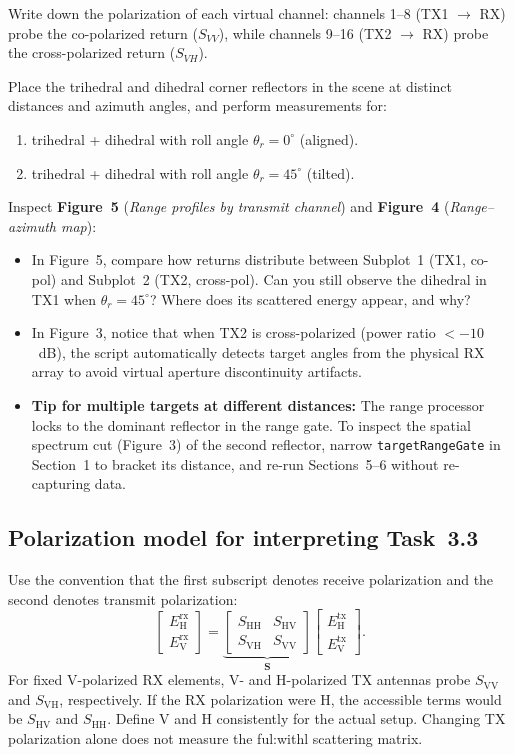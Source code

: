 \documentclass[11pt,a4paper]{article}
\begin{document}
Write down the polarization of each virtual channel: channels 1--8 (TX1 $\to$ RX) probe the co-polarized return ($S_{VV}$), while channels 9--16 (TX2 $\to$ RX) probe the cross-polarized return ($S_{VH}$).

Place the trihedral and dihedral corner reflectors in the scene at distinct distances and azimuth angles, and perform measurements for:
\begin{enumerate}
    \item trihedral + dihedral with roll angle $\theta_r = 0^\circ$ (aligned).
    \item trihedral + dihedral with roll angle $\theta_r = 45^\circ$ (tilted).
\end{enumerate}

Inspect \textbf{Figure~5} (\textit{Range profiles by transmit channel}) and \textbf{Figure~4} (\textit{Range--azimuth map}):
\begin{itemize}
\item In Figure~5, compare how returns distribute between Subplot~1 (TX1, co-pol) and Subplot~2 (TX2, cross-pol). Can you still observe the dihedral in TX1 when $\theta_r = 45^\circ$? Where does its scattered energy appear, and why?
\item In Figure~3, notice that when TX2 is cross-polarized (power ratio $<-10$~dB), the script automatically detects target angles from the physical RX array to avoid virtual aperture discontinuity artifacts.
\item \textbf{Tip for multiple targets at different distances:} The range processor locks to the dominant reflector in the range gate. To inspect the spatial spectrum cut (Figure~3) of the second reflector, narrow \texttt{targetRangeGate} in Section~1 to bracket its distance, and re-run Sections~5--6 without re-capturing data.
\end{itemize}


\newpage
\subsection*{Polarization model for interpreting Task~3.3}
Use the convention that the first subscript denotes receive polarization and
the second denotes transmit polarization:
\[
  \begin{bmatrix}E_\mathrm{H}^{\mathrm{rx}}\\E_\mathrm{V}^{\mathrm{rx}}\end{bmatrix}
=\underbrace{\begin{bmatrix}S_\mathrm{HH}&S_\mathrm{HV}\\S_\mathrm{VH}&S_\mathrm{VV}\end{bmatrix}}_{\mathbf S}
\begin{bmatrix}E_\mathrm{H}^{\mathrm{tx}}\\E_\mathrm{V}^{\mathrm{tx}}\end{bmatrix}.
\]
For fixed V-polarized RX elements, V- and H-polarized TX antennas probe
$S_\mathrm{VV}$ and $S_\mathrm{VH}$, respectively. If the RX polarization were H, the accessible
terms would be $S_\mathrm{HV}$ and $S_\mathrm{HH}$. Define V and H consistently for the actual setup.
Changing TX polarization alone does not measure the ful:withl scattering matrix.
\end{document}
